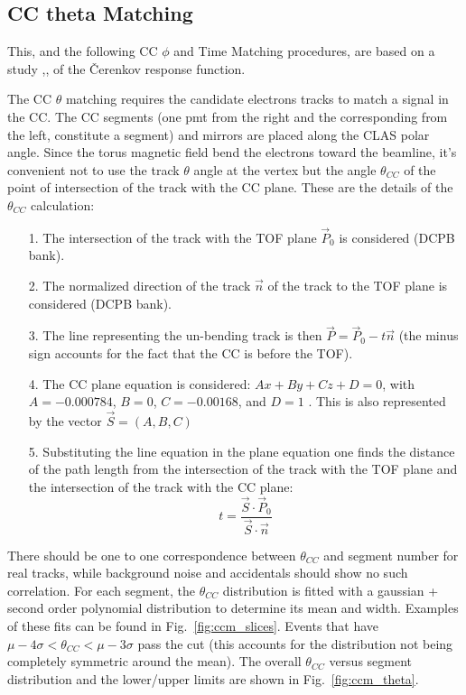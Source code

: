 \clearpage\newpage

\subsection{CC theta Matching}

This, and the following CC $\phi$ and Time Matching procedures, are based on a study
\cite{bib:ccmatch},\cite{bib:pc_fxpun}, \cite{bib:pc_osi} of the \v Cerenkov response function.

The CC $\theta$ matching requires the candidate electrons tracks to match
a signal in the CC. The CC segments (one pmt from the right and the corresponding from the left,
constitute a segment) and mirrors are placed along the CLAS polar angle.
Since the torus magnetic field bend the electrons toward the beamline, it's convenient
not to use the track $\theta$ angle at the vertex but the angle $\theta_{CC}$ of the point of
intersection of the track with the CC plane. These are the details of the  $\theta_{CC}$
calculation:
\begin{itemize}
    \item [1.] The intersection of the track with the TOF plane  $\vec{P}_0$ is considered (DCPB bank).
    \item [2.] The normalized direction of the track $\vec{n}$ of the track to the TOF plane is considered (DCPB bank).
    \item [3.] The line representing the un-bending track is then $\vec{P} = \vec{P}_0 - t\vec{n}$
    (the minus sign accounts for the fact that the CC is before the TOF).
    \item [4.] The CC plane equation is considered: $Ax+By+Cz+D=0$, with
    $A=-0.000784$, $B=0$, $C=-0.00168$, and $D=1$ \cite{bib:ccmatch}. This is also represented
    by the vector $\vec{S} = (A, B, C)$
    \item [5.] Substituting the line equation in the plane equation one finds the distance of the path length from the
    intersection of the track with the TOF plane and the intersection of the track with the CC plane:
    $$t=\frac{\vec{S} \cdot \vec{P}_0}{\vec{S} \cdot \vec{n}}$$
\end{itemize}
There should be one to one correspondence between $\theta_{CC}$ and segment number for real tracks, while
background noise and accidentals should show no such correlation.
For each segment, the $\theta_{CC}$ distribution is fitted with a gaussian + second order
polynomial distribution to determine its mean and width. Examples of these fits can be found
in Fig.~\ref{fig:ccm_slices}. Events that have $\mu - 4\sigma < \theta_{CC} < \mu - 3\sigma$
pass the cut (this accounts for the distribution not being completely symmetric around the mean).
The overall $\theta_{CC}$ versus segment distribution and the lower/upper limits
are shown in Fig.~\ref{fig:ccm_theta}.

